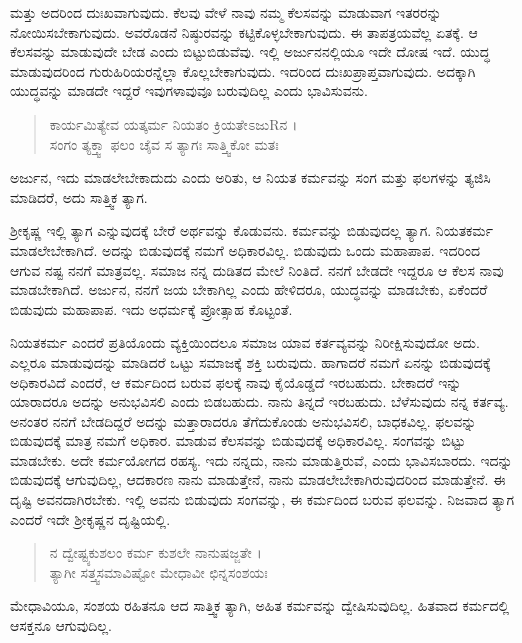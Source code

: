 ಮತ್ತು ಅದರಿಂದ ದುಃಖವಾಗುವುದು. ಕೆಲವು ವೇಳೆ ನಾವು ನಮ್ಮ ಕೆಲಸವನ್ನು ಮಾಡುವಾಗ ಇತರರನ್ನು ನೋಯಿಸಬೇಕಾಗುವುದು. ಅವರೊಡನೆ ನಿಷ್ಠುರವನ್ನು ಕಟ್ಟಿಕೊಳ್ಳಬೇಕಾಗುವುದು. ಈ ತಾಪತ್ರಯವೆಲ್ಲ ಏತಕ್ಕೆ. ಆ ಕೆಲಸವನ್ನು ಮಾಡುವುದೇ ಬೇಡ ಎಂದು ಬಿಟ್ಟುಬಿಡುವೆವು. ಇಲ್ಲಿ ಅರ್ಜುನನಲ್ಲಿಯೂ ಇದೇ ದೋಷ ಇದೆ. ಯುದ್ಧ ಮಾಡುವುದರಿಂದ ಗುರುಹಿರಿಯರನ್ನೆಲ್ಲಾ ಕೊಲ್ಲಬೇಕಾಗುವುದು. ಇದರಿಂದ ದುಃಖಪ್ರಾಪ್ತವಾಗುವುದು. ಅದಕ್ಕಾಗಿ ಯುದ್ಧವನ್ನು ಮಾಡದೇ ಇದ್ದರೆ ಇವುಗಳಾವುವೂ ಬರುವುದಿಲ್ಲ ಎಂದು ಭಾವಿಸುವನು.

\begin{verse}
ಕಾರ್ಯಮಿತ್ಯೇವ ಯತ್ಕರ್ಮ ನಿಯತಂ ಕ್ರಿಯತೇಽಜುRನ ।\\ಸಂಗಂ ತ್ಯಕ್ತ್ವಾ ಫಲಂ ಚೈವ ಸ ತ್ಯಾಗಃ ಸಾತ್ತ್ವಿಕೋ ಮತಃ 
\end{verse}

{\small ಅರ್ಜುನ, ಇದು ಮಾಡಲೇಬೇಕಾದುದು ಎಂದು ಅರಿತು, ಆ ನಿಯತ ಕರ್ಮವನ್ನು ಸಂಗ ಮತ್ತು ಫಲಗಳನ್ನು ತ್ಯಜಿಸಿ ಮಾಡಿದರೆ, ಅದು ಸಾತ್ತ್ವಿಕ ತ್ಯಾಗ. }

ಶ್ರೀಕೃಷ್ಣ ಇಲ್ಲಿ ತ್ಯಾಗ ಎನ್ನುವುದಕ್ಕೆ ಬೇರೆ ಅರ್ಥವನ್ನು ಕೊಡುವನು. ಕರ್ಮವನ್ನು ಬಿಡುವುದಲ್ಲ ತ್ಯಾಗ. ನಿಯತಕರ್ಮ ಮಾಡಲೇಬೇಕಾಗಿದೆ. ಅದನ್ನು ಬಿಡುವುದಕ್ಕೆ ನಮಗೆ ಅಧಿಕಾರವಿಲ್ಲ. ಬಿಡುವುದು ಒಂದು ಮಹಾಪಾಪ. ಇದರಿಂದ ಆಗುವ ನಷ್ಟ ನನಗೆ ಮಾತ್ರವಲ್ಲ. ಸಮಾಜ ನನ್ನ ದುಡಿತದ ಮೇಲೆ ನಿಂತಿದೆ. ನನಗೆ ಬೇಡದೇ ಇದ್ದರೂ ಆ ಕೆಲಸ ನಾವು ಮಾಡಬೇಕಾಗಿದೆ. ಅರ್ಜುನ, ನನಗೆ ಜಯ ಬೇಕಾಗಿಲ್ಲ ಎಂದು ಹೇಳಿದರೂ, ಯುದ್ಧವನ್ನು ಮಾಡಬೇಕು, ಏಕೆಂದರೆ ಬಿಡುವುದು ಮಹಾಪಾಪ. ಇದು ಅಧರ್ಮಕ್ಕೆ ಪ್ರೋತ್ಸಾಹ ಕೊಟ್ಟಂತೆ.

ನಿಯತಕರ್ಮ ಎಂದರೆ ಪ್ರತಿಯೊಂದು ವ್ಯಕ್ತಿಯಿಂದಲೂ ಸಮಾಜ ಯಾವ ಕರ್ತವ್ಯವನ್ನು ನಿರೀಕ್ಷಿಸುವುದೋ ಅದು. ಎಲ್ಲರೂ ಮಾಡುವುದನ್ನು ಮಾಡಿದರೆ ಒಟ್ಟು ಸಮಾಜಕ್ಕೆ ಶಕ್ತಿ ಬರುವುದು. ಹಾಗಾದರೆ ನಮಗೆ ಏನನ್ನು ಬಿಡುವುದಕ್ಕೆ ಅಧಿಕಾರವಿದೆ ಎಂದರೆ, ಆ ಕರ್ಮದಿಂದ ಬರುವ ಫಲಕ್ಕೆ ನಾವು ಕೈಯೊಡ್ಡದೆ ಇರಬಹುದು. ಬೇಕಾದರೆ ಇನ್ನು ಯಾರಾದರೂ ಅದನ್ನು ಅನುಭವಿಸಲಿ ಎಂದು ಬಿಡಬಹುದು. ನಾನು ತಿನ್ನದೆ ಇರಬಹುದು. ಬೆಳೆಸುವುದು ನನ್ನ ಕರ್ತವ್ಯ. ಅನಂತರ ನನಗೆ ಬೇಡದಿದ್ದರೆ ಅದನ್ನು ಮತ್ತಾರಾದರೂ ತೆಗೆದುಕೊಂಡು ಅನುಭವಿಸಲಿ, ಬಾಧಕವಿಲ್ಲ. ಫಲವನ್ನು ಬಿಡುವುದಕ್ಕೆ ಮಾತ್ರ ನಮಗೆ ಅಧಿಕಾರ. ಮಾಡುವ ಕೆಲಸವನ್ನು ಬಿಡುವುದಕ್ಕೆ ಅಧಿಕಾರವಿಲ್ಲ. ಸಂಗವನ್ನು ಬಿಟ್ಟು ಮಾಡಬೇಕು. ಅದೇ ಕರ್ಮಯೋಗದ ರಹಸ್ಯ. ಇದು ನನ್ನದು, ನಾನು ಮಾಡುತ್ತಿರುವೆ, ಎಂದು ಭಾವಿಸಬಾರದು. ಇದನ್ನು ಬಿಡುವುದಕ್ಕೆ ಆಗುವುದಿಲ್ಲ, ಆದಕಾರಣ ನಾನು ಮಾಡುತ್ತೇನೆ, ನಾನು ಮಾಡಲೇಬೇಕಾಗಿರುವುದರಿಂದ ಮಾಡುತ್ತೇನೆ. ಈ ದೃಷ್ಟಿ ಅವನದಾಗಿರಬೇಕು. ಇಲ್ಲಿ ಅವನು ಬಿಡುವುದು ಸಂಗವನ್ನು, ಈ ಕರ್ಮದಿಂದ ಬರುವ ಫಲವನ್ನು. ನಿಜವಾದ ತ್ಯಾಗ ಎಂದರೆ ಇದೇ ಶ್ರೀಕೃಷ್ಣನ ದೃಷ್ಟಿಯಲ್ಲಿ.

\begin{verse}
ನ ದ್ವೇಷ್ಟ್ಯಕುಶಲಂ ಕರ್ಮ ಕುಶಲೇ ನಾನುಷಜ್ಜತೇ ।\\ತ್ಯಾಗೀ ಸತ್ತ್ವಸಮಾವಿಷ್ಟೋ ಮೇಧಾವೀ ಛಿನ್ನಸಂಶಯಃ 
\end{verse}

{\small ಮೇಧಾವಿಯೂ, ಸಂಶಯ ರಹಿತನೂ ಆದ ಸಾತ್ತ್ವಿಕ ತ್ಯಾಗಿ, ಅಹಿತ ಕರ್ಮವನ್ನು ದ್ವೇಷಿಸುವುದಿಲ್ಲ. ಹಿತವಾದ ಕರ್ಮದಲ್ಲಿ ಆಸಕ್ತನೂ ಆಗುವುದಿಲ್ಲ.}

